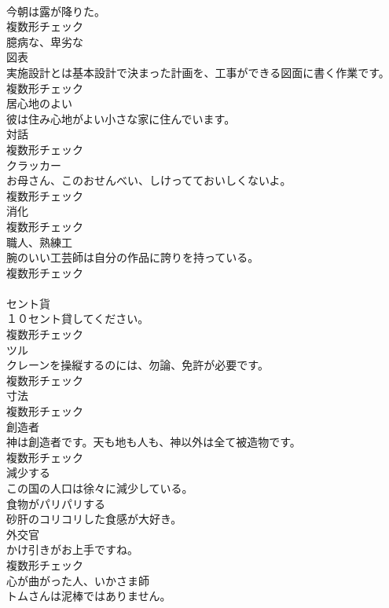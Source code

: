\documentclass[8pt]{extreport}
\begin{document}
\begin{CJK}{UTF8}{min}
\\	今朝は露が降りた。	
\\	複数形チェック
\\	[形容詞]	臆病な、卑劣な	
\\	[名詞]	図表	
\\	実施設計とは基本設計で決まった計画を、工事ができる図面に書く作業です。	
\\	複数形チェック
\\	[形容詞]	居心地のよい	
\\	彼は住み心地がよい小さな家に住んでいます。	
\\	[名詞]	対話	
\\	複数形チェック
\\	[名詞]	クラッカー	
\\	お母さん、このおせんべい、しけってておいしくないよ。	
\\	複数形チェック
\\	[名詞]	消化	
\\	複数形チェック
\\	[名詞]	職人、熟練工	
\\	腕のいい工芸師は自分の作品に誇りを持っている。	
\\	複数形チェック
\\	[名詞]	
\\	セント貨	
\\	１０セント貸してください。	
\\	複数形チェック
\\	[名詞]	ツル	
\\	クレーンを操縦するのには、勿論、免許が必要です。	
\\	複数形チェック
\\	[名詞]	寸法	
\\	複数形チェック
\\	[名詞]	創造者	
\\	神は創造者です。天も地も人も、神以外は全て被造物です。	
\\	複数形チェック
\\	[動詞]	減少する	
\\	この国の人口は徐々に減少している。	
\\	[形容詞]	食物がパリパリする	
\\	砂肝のコリコリした食感が大好き。	
\\	[名詞]	外交官	
\\	かけ引きがお上手ですね。	
\\	複数形チェック
\\	[名詞]	心が曲がった人、いかさま師	
\\	トムさんは泥棒ではありません。	

\end{CJK}
\end{document}
